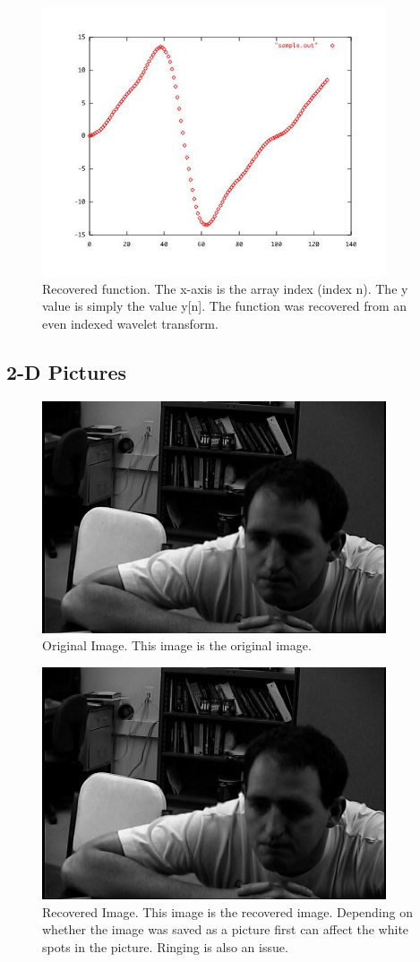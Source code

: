 \documentclass[11pt]{article}
\begin{document}
\begin{figure}
\includegraphics [width=4in]{sample.jpg}
\caption{Recovered function.  The x-axis is the array index (index n).  The y value is simply the value y[n].  The function was recovered from an even indexed wavelet transform. }
\label{recoverEven}
\end{figure}


\subsection { 2-D Pictures}


\begin{figure}
\includegraphics [width=4in]{rightDan.jpg}
\caption{Original Image.  This image is the original image. }
\label{rightDan}
\end{figure}

\begin{figure}
\includegraphics [width=4in]{revRecover.jpg}
\caption{Recovered Image.  This image is the recovered image.  Depending on whether the image was saved as a picture first can affect the white spots in the picture.  Ringing is also an issue.  }
\label{rightDanRecovered}
\end{figure}
\end{document}
